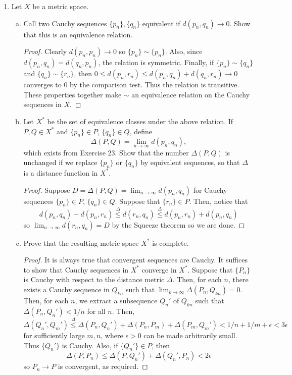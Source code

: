 \begin{enumerate}
\item %
Let $X$ be a metric space.
\begin{enumerate}[(a)]
\item Call two Cauchy sequences $\{p_n\}, \{q_n\}$ \underline{equivalent} if $d(p_n, q_n) \to 0$. Show that this is an equivalence relation.

\begin{proof}
    Clearly $d(p_n, p_n) \to 0$ so $\{p_n\} \sim \{p_n\}$. Also, since $d(p_n, q_n) = d(q_n, p_n)$, the relation is symmetric. Finally, if $\{p_n\} \sim \{q_n\}$ and $\{q_n\} \sim \{r_n\}$, then $0 \le d(p_n, r_n) \le d(p_n, q_n) + d(q_n, r_n) \to 0$ converges to 0 by the comparison test. Thus the relation is transitive. These properties together make $\sim$ an equivalence relation on the Cauchy sequences in $X$.
\end{proof}

\item Let $X^*$ be the set of equivalence classes under the above relation. If $P, Q \in X^*$ and $\{p_n\} \in P$, $\{q_n\} \in Q$, define
\[
	\Delta(P, Q) = \lim_{n \to \infty} d(p_n, q_n),
\]
which exists from Exercise 23. Show that the number $\Delta(P, Q)$ is unchanged if we replace $\{p_n\}$ or $\{q_n\}$ by equivalent sequences, so that $\Delta$ is a distance function in $X^*$.

\begin{proof}
    Suppose $D = \Delta(P, Q) = \lim_{n \to \infty} d(p_n, q_n)$ for Cauchy sequences $\{p_n\} \in P$, $\{q_n\} \in Q$. Suppose that $\{r_n\} \in P$. Then, notice that
    \[  
        d(p_n, q_n) - d(p_n, r_n) \overset{\Delta}{\le} d(r_n, q_n) \overset{\Delta}{\le} d(p_n, r_n) + d(p_n, q_n)
    \]
    so $\lim_{n \to \infty} d(r_n, q_n) = D$ by the Squeeze theorem so we are done.
\end{proof}
\item Prove that the resulting metric space $X^*$ is complete.

\begin{proof}
    It is always true that convergent sequences are Cauchy. It suffices to show that Cauchy sequences in $X^*$ converge in $X^*$. Suppose that $\{P_n\}$ is Cauchy with respect to the distance metric $\Delta$. Then, for each $n$, there exists a Cauchy sequence in $Q_{kn}$ such that $\lim_{k \to \infty} \Delta(P_n, Q_{kn}) = 0$. Then, for each $n$, we extract a subsequence $Q_n'$ of $Q_{kn}$ such that $\Delta(P_n, Q_n') < 1/n$ for all $n$. Then,
    \[
        \Delta(Q_n', Q_m') \overset{\Delta}{\le} \Delta(P_n, Q_n') + \Delta(P_n, P_m) + \Delta(P_m, Q_m') < 1/n + 1/m + \epsilon < 3\epsilon
    \]
    for sufficiently large $m, n$, where $\epsilon > 0$ can be made arbitrarily small. Thus $\{Q_n'\}$ is Cauchy. Also, if $\{Q_n'\} \in P$, then 
    \[
        \Delta(P, P_n) \le \Delta(P, Q_n') + \Delta(Q_n', P_n) < 2\epsilon
    \]
    so $P_n \to P$ is convergent, as required.
\end{proof}


\end{enumerate}
\end{enumerate}

